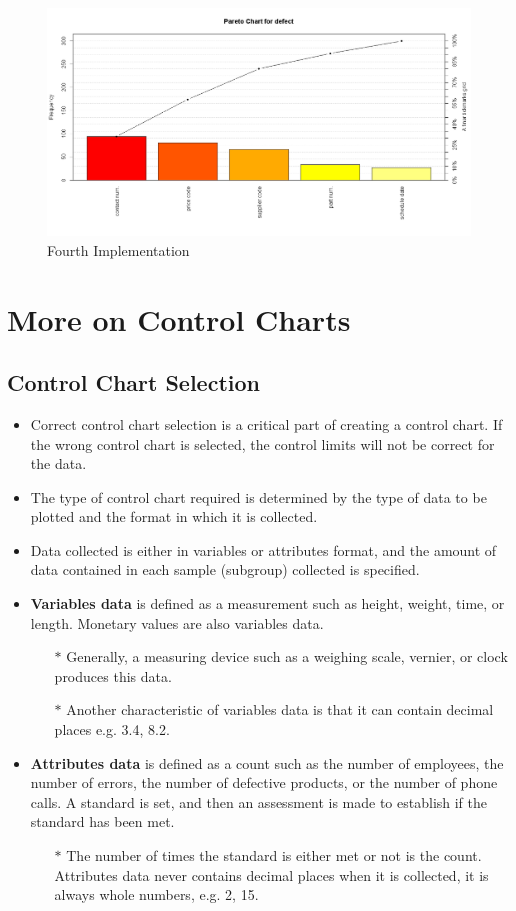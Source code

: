 \documentclass[]{article}
\begin{document}
\begin{figure}[h!]
\centering
\includegraphics[width=0.8\linewidth]{./Pareto5}
\caption{Fourth Implementation}
\label{fig:Pareto5}
\end{figure}

\section{More on Control Charts}

\newpage
\subsection{Control Chart Selection}
\begin{itemize}
\item Correct control chart selection is a critical part of creating a control chart. If the wrong control chart is selected, the control limits will not be correct for the data. 
\item The type of control chart required is determined by the type of data to be plotted and the format in which it is collected. \item Data collected is either in variables or attributes format, and the amount of data contained in each sample (subgroup) collected is specified.

\item \textbf{Variables data} is defined as a measurement such as height, weight, time, or length. Monetary values are also variables data. 
\begin{itemize}
\item[$\ast$] Generally, a measuring device such as a weighing scale, vernier, or clock produces this data. \item[$\ast$] Another characteristic of variables data is that it can contain decimal places e.g. 3.4, 8.2.
\end{itemize}

\item \textbf{Attributes data} is defined as a count such as the number of employees, the number of errors, the number of defective products, or the number of phone calls. A standard is set, and then an assessment is made to establish if the standard has been met. 
\begin{itemize}
\item[$\ast$] The number of times the standard is either met or not is the count. Attributes data never contains decimal places when it is collected, it is always whole numbers, e.g. 2, 15.
\end{itemize}
\end{itemize}
\end{document}
